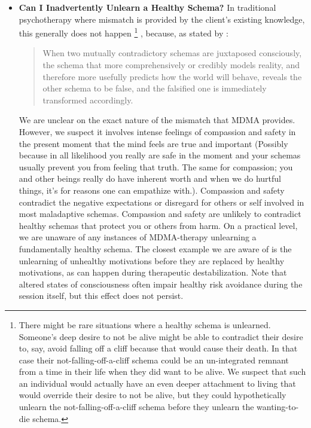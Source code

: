 \documentclass[12pt,letterpaper]{book}
\begin{document}
\begin{itemize}
        \item \textbf{Can I Inadvertently Unlearn a Healthy Schema?}
            In traditional psychotherapy where mismatch is provided by the client's existing knowledge, this generally does not happen \footnote{There might be rare situations where a healthy schema is unlearned. Someone's deep desire to not be alive might be able to contradict their desire to, say, avoid falling off a cliff because that would cause their death. In that case their not-falling-off-a-cliff schema could be an un-integrated remnant from a time in their life when they did want to be alive. We suspect that such an individual would actually have an even deeper attachment to living that would override their desire to not be alive, but they could hypothetically unlearn the not-falling-off-a-cliff schema before they unlearn the wanting-to-die schema.} , because, as stated by \textcite{ecker2015misunderstood}:
            \begin{quotation}
            	When two mutually contradictory schemas are juxtaposed consciously, the schema that more comprehensively or credibly models reality, and therefore more usefully predicts how the world will behave, reveals the other schema to be false, and the falsified one is immediately transformed accordingly.
            \end{quotation}
            We are unclear on the exact nature of the mismatch that MDMA provides. However, we suspect it involves intense feelings of compassion and safety in the present moment that the mind feels are true and important (Possibly because in all likelihood you really are safe in the moment and your schemas usually prevent you from feeling that truth. The same for compassion; you and other beings really do have inherent worth and when we do hurtful things, it's for reasons one can empathize with.). Compassion and safety contradict the negative expectations or disregard for others or self involved in most maladaptive schemas. Compassion and safety are unlikely to contradict healthy schemas that protect you or others from harm. On a practical level, we are unaware of any instances of MDMA-therapy unlearning a fundamentally healthy schema. The closest example we are aware of is the unlearning of unhealthy motivations before they are replaced by healthy motivations, as can happen during therapeutic destabilization. Note that altered states of consciousness often impair healthy risk avoidance during the session itself, but this effect does not persist.
\end{itemize}
\end{document}
